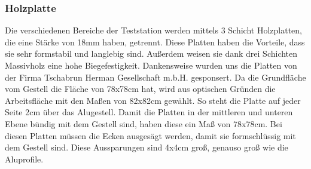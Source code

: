 \subsubsection{Holzplatte}
Die verschiedenen Bereiche der Teststation werden mittels  3 Schicht Holzplatten, die eine Stärke von 18mm haben, getrennt. Diese Platten haben die Vorteile, dass sie sehr formstabil und langlebig sind. Außerdem weisen sie dank drei Schichten Massivholz eine hohe Biegefestigkeit. Dankensweise wurden uns die Platten von der Firma Tschabrun Herman Gesellschaft m.b.H. gesponsert. Da die Grundfläche vom Gestell die Fläche von 78x78cm hat, wird aus optischen Gründen die Arbeitsfläche mit den Maßen von 82x82cm gewählt. So steht die Platte auf jeder Seite 2cm über das Alugestell. Damit die Platten in der mittleren und unteren Ebene bündig mit dem Gestell sind, haben diese ein Maß von 78x78cm. Bei diesen Platten müssen die Ecken ausgesägt werden, damit sie formschlüssig mit dem Gestell sind. Diese Aussparungen sind 4x4cm groß, genauso groß wie die Aluprofile. 
\vspace{5mm}
